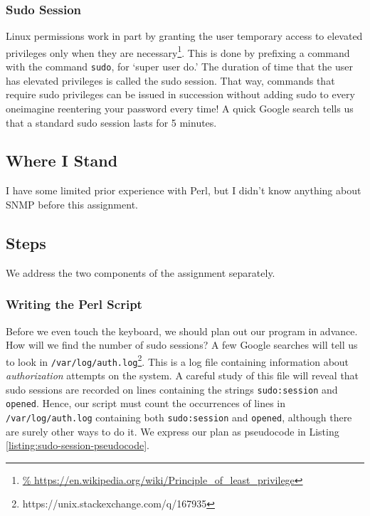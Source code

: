\documentclass{article}
\begin{document}
\subsubsection{Sudo Session}

Linux permissions work in part by granting the user temporary access to elevated
privileges only when they are
%
necessary\footnote{\url{%
https://en.wikipedia.org/wiki/Principle_of_least_privilege}}.
%
This is done by prefixing a command with the command \verb|sudo|, for `super
user do.'  The duration of time that the user has elevated privileges is called
the sudo session.  That way, commands that require sudo privileges can be issued
in succession without adding sudo to every one\textemdash imagine reentering
your password every time! A quick Google search tells us that a standard sudo
session lasts for 5 minutes.


\subsection{Where I Stand}

I have some limited prior experience with Perl, but I didn't know anything about
SNMP before this assignment.


\subsection{Steps}

We address the two components of the assignment separately.

\subsubsection{Writing the Perl Script}

Before we even touch the keyboard, we should plan out our program in advance.
How will we find the number of sudo sessions?  A few Google searches will tell
us to look in
%
\verb|/var/log/auth.log|\footnote{https://unix.stackexchange.com/q/167935}.
%
This is a log file containing information about \emph{authorization} attempts on
the system. A careful study of this file will reveal that sudo sessions are
recorded on lines containing the strings \verb|sudo:session| and \verb|opened|.
Hence, our script must count the occurrences of lines in
\verb|/var/log/auth.log| containing both \verb|sudo:session| and \verb|opened|,
although there are surely other ways to do it.  We express our plan as
pseudocode in Listing \ref{listing:sudo-session-pseudocode}.
\end{document}
